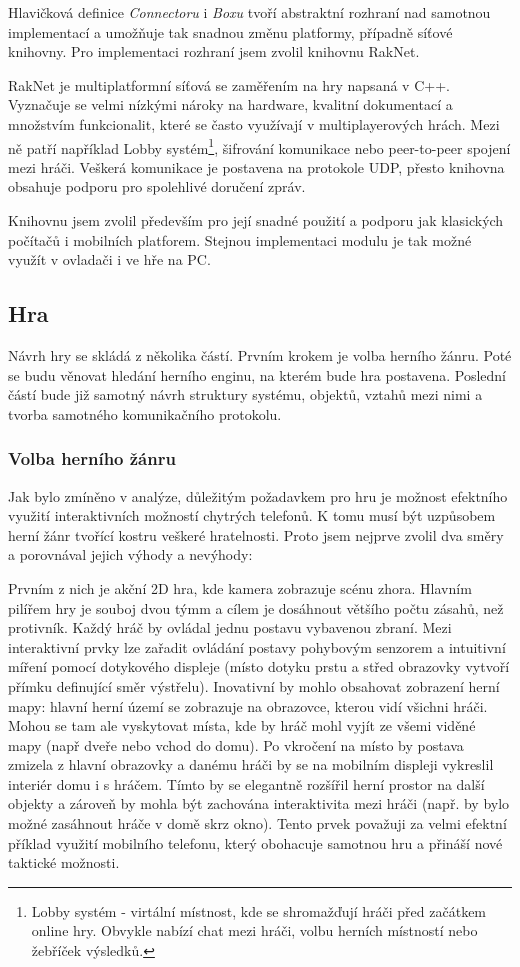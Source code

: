 \documentclass[thesis=B,czech,hidelinks]{FITthesis}[2012/06/26] %
\begin{document}
Hlavičková definice \textit{Connectoru} i \textit{Boxu} tvoří abstraktní rozhraní nad samotnou implementací a umožňuje tak snadnou změnu platformy, případně síťové knihovny. Pro implementaci rozhraní jsem zvolil knihovnu RakNet.

RakNet je multiplatformní síťová se zaměřením na hry napsaná v C++. Vyznačuje se velmi nízkými nároky na hardware, kvalitní dokumentací a množstvím funkcionalit, které se často využívají v multiplayerových hrách. \cite{raknet} Mezi ně patří například Lobby systém\footnote{Lobby systém - virtální místnost, kde se shromažďují hráči před začátkem online hry. Obvykle nabízí chat mezi hráči, volbu herních místností nebo žebříček výsledků.}, šifrování komunikace nebo peer-to-peer spojení mezi hráči. Veškerá komunikace je postavena na protokole UDP, přesto knihovna obsahuje podporu pro spolehlivé doručení zpráv.

Knihovnu jsem zvolil především pro její snadné použití a podporu jak klasických počítačů i mobilních platforem. Stejnou implementaci modulu je tak možné využít v ovladači i ve hře na PC.

\subsection{Hra}

Návrh hry se skládá z několika částí. Prvním krokem je volba herního žánru. Poté se budu věnovat hledání herního enginu, na kterém bude hra postavena. Poslední částí bude již samotný návrh struktury systému, objektů, vztahů mezi nimi a tvorba samotného komunikačního protokolu.

\subsubsection{Volba herního žánru}

Jak bylo zmíněno v analýze, důležitým požadavkem pro hru je možnost efektního využití interaktivních možností chytrých telefonů. K tomu musí být uzpůsobem herní žánr tvořící kostru veškeré hratelnosti. Proto jsem nejprve zvolil dva směry a porovnával jejich výhody a nevýhody:

Prvním z nich je akční 2D hra, kde kamera zobrazuje scénu zhora. Hlavním pilířem hry je souboj dvou týmm a cílem je dosáhnout většího počtu zásahů, než protivník. Každý hráč by ovládal jednu postavu vybavenou zbraní. Mezi interaktivní prvky lze zařadit ovládání postavy pohybovým senzorem a intuitivní míření pomocí dotykového displeje (místo dotyku prstu a střed obrazovky vytvoří přímku definující směr výstřelu). Inovativní by mohlo obsahovat zobrazení herní mapy: hlavní herní území se zobrazuje na obrazovce, kterou vidí všichni hráči. Mohou se tam ale vyskytovat místa, kde by hráč mohl vyjít ze všemi viděné mapy (např dveře nebo vchod do domu). Po vkročení na místo by postava zmizela z hlavní obrazovky a danému hráči by se na mobilním displeji vykreslil interiér domu i s hráčem. Tímto by se elegantně rozšířil herní prostor na další objekty a zároveň by mohla být zachována interaktivita mezi hráči (např. by bylo možné zasáhnout hráče v domě skrz okno). Tento prvek považuji za velmi efektní příklad využití mobilního telefonu, který obohacuje samotnou hru a přináší nové taktické možnosti.
\end{document}

